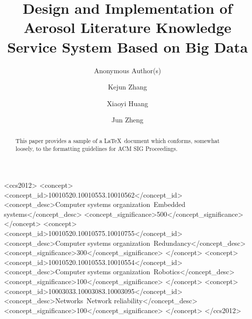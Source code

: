 \documentclass[sigchi, review]{acmart}
\begin{document}
\title{Design and Implementation of Aerosol Literature Knowledge Service System Based on Big Data}
\subtitle{Anonymous Author(s)}

\author{Kejun Zhang}

\author{Xiaoyi Huang}

\author{Jun Zheng}



\renewcommand{\shortauthors}{B. Trovato et al.}


\begin{abstract}
This paper provides a sample of a \LaTeX\ document which conforms,
somewhat loosely, to the formatting guidelines for
ACM SIG Proceedings.
\end{abstract}

%
%
\begin{CCSXML}
<ccs2012>
 <concept>
  <concept_id>10010520.10010553.10010562</concept_id>
  <concept_desc>Computer systems organization~Embedded systems</concept_desc>
  <concept_significance>500</concept_significance>
 </concept>
 <concept>
  <concept_id>10010520.10010575.10010755</concept_id>
  <concept_desc>Computer systems organization~Redundancy</concept_desc>
  <concept_significance>300</concept_significance>
 </concept>
 <concept>
  <concept_id>10010520.10010553.10010554</concept_id>
  <concept_desc>Computer systems organization~Robotics</concept_desc>
  <concept_significance>100</concept_significance>
 </concept>
 <concept>
  <concept_id>10003033.10003083.10003095</concept_id>
  <concept_desc>Networks~Network reliability</concept_desc>
  <concept_significance>100</concept_significance>
 </concept>
</ccs2012>
\end{CCSXML}
\end{document}
